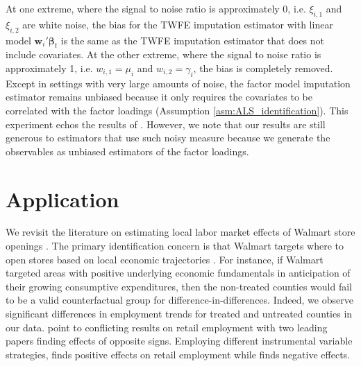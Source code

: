 \documentclass[12pt]{article}
\begin{document}
At one extreme, where the signal to noise ratio is approximately 0, i.e. $\xi_{i,1}$ and $\xi_{i,2}$ are white noise, the bias for the TWFE imputation estimator with linear model $\bm w_i' \bm \beta_t$ is the same as the TWFE imputation estimator that does not include covariates. At the other extreme, where the signal to noise ratio is approximately 1, i.e. $w_{i,1} = \mu_i$ and $w_{i,2} = \gamma_i$, the bias is completely removed. Except in settings with very large amounts of noise, the factor model imputation estimator remains unbiased because it only requires the covariates to be correlated with the factor loadings (Assumption \ref{asm:ALS_identification}). This experiment echos the results of \citet{kejriwal2024efficacy}. However, we note that our results are still generous to estimators that use such noisy measure because we generate the observables as unbiased estimators of the factor loadings. 



\section{Application}\label{sec:application}

We revisit the literature on estimating local labor market effects of Walmart store openings \citep{basker2005job, neumark2008effects, volpe2022economic}. The primary identification concern is that Walmart targets where to open stores based on local economic trajectories \citep{neumark2008effects}. For instance, if Walmart targeted areas with positive underlying economic fundamentals in anticipation of their growing consumptive expenditures, then the non-treated counties would fail to be a valid counterfactual group for difference-in-differences. Indeed, we observe significant differences in employment trends for treated and untreated counties in our data. \citet{volpe2022economic} point to conflicting results on retail employment with two leading papers finding effects of opposite signs. Employing different instrumental variable strategies, \citet{basker2005job} finds positive effects on retail employment while \citet{neumark2008effects} finds negative effects.
\end{document}
